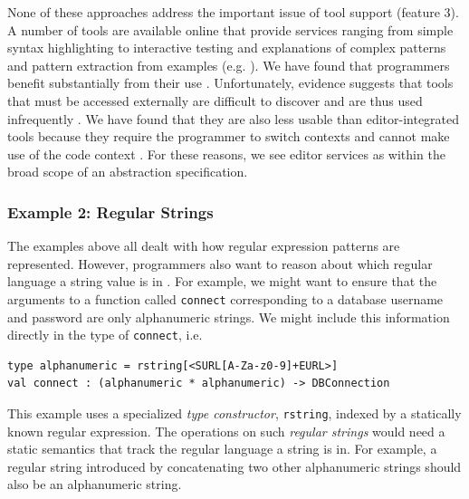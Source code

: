 None of these approaches address the important issue of tool support (feature 3). A number of tools are available online that provide services ranging from simple syntax highlighting to interactive testing and explanations of complex patterns \cite{regexr} and pattern extraction from examples (e.g. \cite{_txt2re:_????}). We have found that programmers benefit substantially from their use \cite{Omar:2012:ACC:2337223.2337324}. Unfortunately, evidence suggests that tools that must be accessed externally are difficult to discover and are thus used infrequently \cite{Murphy-Hill:2011:PIE:1958824.1958888,Campbell:2008:DRT:1636642.1636651,Omar:2012:ACC:2337223.2337324}. We have found that they are also less usable than editor-integrated tools %
because they require the programmer to switch contexts and cannot make use of the code context \cite{Omar:2012:ACC:2337223.2337324}. %
For these reasons,   we see editor services as within the broad scope of an abstraction specification.

\subsubsection{Example 2: Regular Strings}\label{sec:rstr}
The examples above all dealt with how regular expression patterns are represented. However, programmers also want to reason about which regular language a string value is in \cite{sanitation-psp14}. For example, we might want to ensure that the arguments to a function called \verb|connect| corresponding to a database username and password are only alphanumeric strings. We might include this information directly in the type of \verb|connect|, i.e.
\begin{lstlisting}[numbers=none]
type alphanumeric = rstring[<SURL[A-Za-z0-9]+EURL>]
val connect : (alphanumeric * alphanumeric) -> DBConnection
\end{lstlisting}

This example uses a specialized \emph{type constructor}, \verb|rstring|, indexed by a statically known regular expression. The operations on such \emph{regular strings} would need a static semantics that track the regular language a string is in. For example, a regular string introduced by concatenating two other alphanumeric strings  should also be an alphanumeric string.

